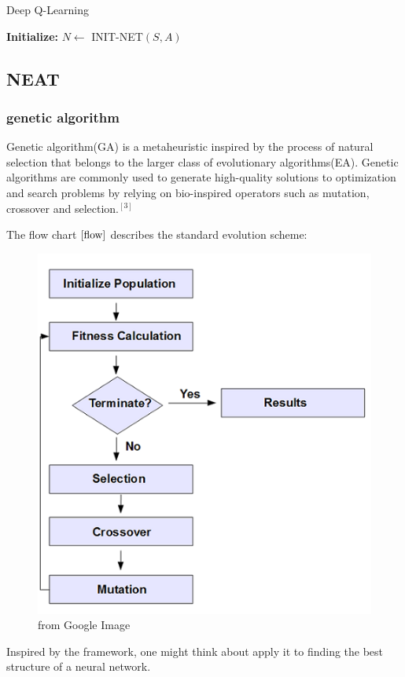 \documentclass{article}
\begin{document}
   \begin{algorithm}[H] 
     \caption{Deep Q-Learning}
     \label{1}
     \textbf{Initialize:} $N \leftarrow$ INIT-NET$(S,A)$ \;    
    \end{algorithm}

\subsection{NEAT}
\subsubsection{genetic algorithm}

Genetic algorithm(GA) is a metaheuristic inspired by the process of natural selection that belongs to the larger class of evolutionary algorithms(EA).
Genetic algorithms are commonly used to generate high-quality solutions to optimization and search problems by relying on bio-inspired operators such as mutation, crossover and selection.$^{[3]}$

The flow chart $\ref{flow}$ describes the standard evolution scheme:
\begin{figure}[htbp]
  \centering
  \includegraphics[width = .5\textwidth]{genetic}
  \caption{from Google Image}
  \label{flow}
\end{figure}
Inspired by the framework, one might think about apply it to finding the best structure of a neural network. 
\end{document}
